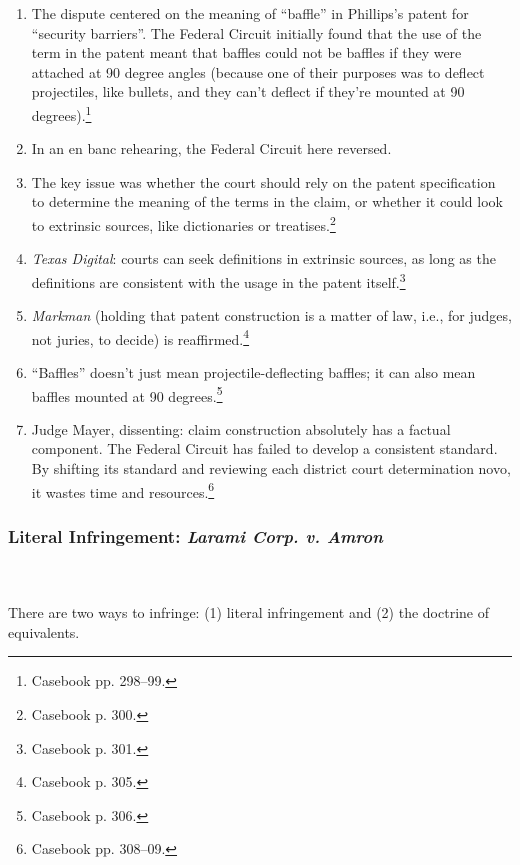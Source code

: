 \begin{enumerate}
    \item The dispute centered on the meaning of ``baffle'' in Phillips's 
    patent for ``security barriers''. The Federal Circuit initially found that 
    the use of the term in the patent meant that baffles could not be baffles 
    if they were attached at 90 degree angles (because one of their purposes 
    was to deflect projectiles, like bullets, and they can't deflect if 
    they're mounted at 90 degrees).\footnote{Casebook pp. 298--99.}
    \item In an en banc rehearing, the Federal Circuit here reversed.
    \item The key issue was whether the court should rely on the patent 
    specification to determine the meaning of the terms in the claim, or 
    whether it could look to extrinsic sources, like dictionaries or 
    treatises.\footnote{Casebook p.  300.}
    \item \emph{Texas Digital}: courts can seek definitions in extrinsic 
    sources, as long as the definitions are consistent with the usage in the 
    patent itself.\footnote{Casebook p. 301.}
    \item \emph{Markman} (holding that patent construction is a matter of law, 
    i.e., for judges, not juries, to decide) is reaffirmed.\footnote{Casebook p. 
    305.}
    \item ``Baffles'' doesn't just mean projectile-deflecting baffles; it can 
    also mean baffles mounted at 90 degrees.\footnote{Casebook p. 306.}
    \item Judge Mayer, dissenting: claim construction absolutely has a factual 
    component. The Federal Circuit has failed to develop a consistent standard. 
    By shifting its standard and reviewing each district court determination 
    novo, it wastes time and resources.\footnote{Casebook pp. 308--09.}
\end{enumerate}

\subsubsection{Literal Infringement: \emph{Larami Corp. v. Amron}}
~\\\\
There are two ways to infringe: (1) literal infringement and (2) the doctrine 
of equivalents.

